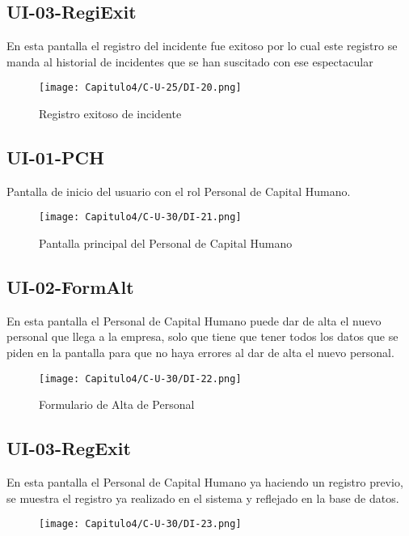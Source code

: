 \subsection{UI-03-RegiExit}
En esta pantalla el registro del incidente fue exitoso por lo cual este registro se manda al historial de incidentes que se han suscitado con ese espectacular
\begin{figure}[htbp!]
\centering
    \texttt{[image: Capitulo4/C-U-25/DI-20.png]}
    \caption{Registro exitoso de incidente}
    \label{fig:my_label}
\end{figure}
\clearpage






\subsection{UI-01-PCH}
Pantalla de inicio del usuario con el rol Personal de Capital Humano.
\begin{figure}[htbp!]
\centering
    \texttt{[image: Capitulo4/C-U-30/DI-21.png]}
    \caption{Pantalla principal del Personal de Capital Humano}
    \label{fig:my_label}
\end{figure}
\clearpage




\subsection{UI-02-FormAlt}
En esta pantalla el Personal de Capital Humano puede dar de alta el nuevo personal que llega a la empresa, solo que tiene que tener todos los datos que se piden en la pantalla para que no haya errores al dar de alta el nuevo personal.
\begin{figure}[htbp!]
\centering
    \texttt{[image: Capitulo4/C-U-30/DI-22.png]}
    \caption{Formulario de Alta de Personal}
    \label{fig:my_label}
\end{figure}
\clearpage



\subsection{UI-03-RegExit}
En esta pantalla el Personal de Capital Humano ya haciendo un registro previo, se muestra el registro ya realizado en el sistema y reflejado en la base de datos.
\begin{figure}[htbp!]
\centering
    \texttt{[image: Capitulo4/C-U-30/DI-23.png]}
    \caption{}
    \label{fig:my_label}
\end{figure}
\clearpage











